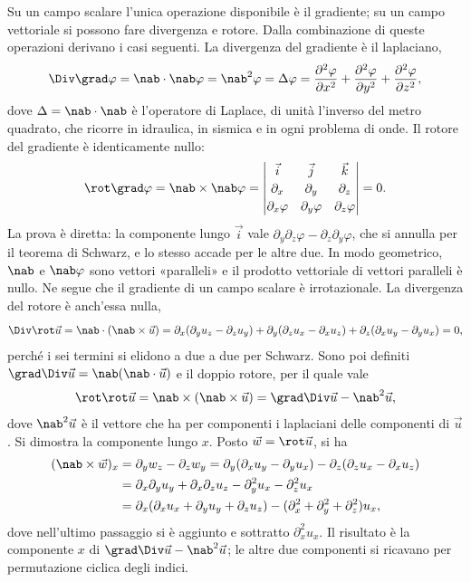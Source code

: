 \documentclass[main.tex]{subfiles}
\begin{document}
Su un campo scalare l'unica operazione disponibile è il gradiente; su un campo vettoriale si possono fare divergenza e rotore. Dalla combinazione di queste operazioni derivano i casi seguenti. La divergenza del gradiente è il laplaciano,
\[
\Div\grad\varphi=\nab\cdot\nab\varphi=\nab^2\varphi=\Delta\varphi=\frac{\partial^2\varphi}{\partial x^2}+\frac{\partial^2\varphi}{\partial y^2}+\frac{\partial^2\varphi}{\partial z^2},
\]
dove $\Delta=\nab\cdot\nab$ è l'operatore di Laplace, di unità l'inverso del metro quadrato, che ricorre in idraulica, in sismica e in ogni problema di onde. Il rotore del gradiente è identicamente nullo:
\[
\rot\grad\varphi=\nab\times\nab\varphi=\begin{vmatrix}\vec i&\vec j&\vec k\\[2pt]\partial_x&\partial_y&\partial_z\\[2pt]\partial_x\varphi&\partial_y\varphi&\partial_z\varphi\end{vmatrix}=0 .
\]
La prova è diretta: la componente lungo $\vec i$ vale $\partial_y\partial_z\varphi-\partial_z\partial_y\varphi$, che si annulla per il teorema di Schwarz, e lo stesso accade per le altre due. In modo geometrico, $\nab$ e $\nab\varphi$ sono vettori «paralleli» e il prodotto vettoriale di vettori paralleli è nullo. Ne segue che il gradiente di un campo scalare è irrotazionale. La divergenza del rotore è anch'essa nulla,
\[
\Div\rot\vec u=\nab\cdot(\nab\times\vec u)=\partial_x(\partial_yu_z-\partial_zu_y)+\partial_y(\partial_zu_x-\partial_xu_z)+\partial_z(\partial_xu_y-\partial_yu_x)=0 ,
\]
perché i sei termini si elidono a due a due per Schwarz. Sono poi definiti $\grad\Div\vec u=\nab(\nab\cdot\vec u)$ e il doppio rotore, per il quale vale
\[
\rot\rot\vec u=\nab\times(\nab\times\vec u)=\grad\Div\vec u-\nab^2\vec u ,
\]
dove $\nab^2\vec u$ è il vettore che ha per componenti i laplaciani delle componenti di $\vec u$. Si dimostra la componente lungo $x$. Posto $\vec w=\rot\vec u$, si ha
\begin{align*}
(\nab\times\vec w)_x&=\partial_yw_z-\partial_zw_y=\partial_y(\partial_xu_y-\partial_yu_x)-\partial_z(\partial_zu_x-\partial_xu_z)\\
&=\partial_x\partial_yu_y+\partial_x\partial_zu_z-\partial_y^2u_x-\partial_z^2u_x\\
&=\partial_x(\partial_xu_x+\partial_yu_y+\partial_zu_z)-(\partial_x^2+\partial_y^2+\partial_z^2)u_x ,
\end{align*}
dove nell'ultimo passaggio si è aggiunto e sottratto $\partial_x^2u_x$. Il risultato è la componente $x$ di $\grad\Div\vec u-\nab^2\vec u$; le altre due componenti si ricavano per permutazione ciclica degli indici.
\end{document}
